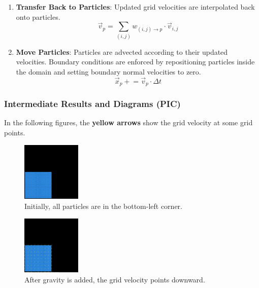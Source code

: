 \begin{enumerate}
\item \textbf{Transfer Back to Particles}: Updated grid velocities are interpolated back onto particles.
\begin{equation}
  \vec{v}_p = \sum_{(i,j)} w_{(i,j) \rightarrow p} \cdot \vec{v}_{i,j}
  \end{equation}

\item \textbf{Move Particles}: Particles are advected according to their updated velocities. Boundary conditions are enforced by repositioning particles inside the domain and setting boundary normal velocities to zero.
\begin{equation}
  \vec{x}_p \mathrel{+}= \vec{v}_p \cdot \Delta t
  \end{equation}
\end{enumerate}

\subsubsection{Intermediate Results and Diagrams (PIC)}

In the following figures, the \textbf{yellow arrows} show the grid velocity at some grid points.

\begin{figure}[h]
    \centering
    \includegraphics[width=0.25\textwidth]{figures/pic_init.png}
    \caption{Initially, all particles are in the bottom-left corner.}
    \label{fig:pic_init}
\end{figure}

\begin{figure}[h]
    \centering
    \includegraphics[width=0.25\textwidth]{figures/pic_apply_g.png}
    \caption{After gravity is added, the grid velocity points downward.}
    \label{fig:pic_gravity}
\end{figure}

